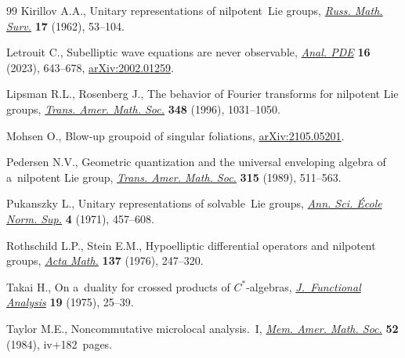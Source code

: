 \begin{thebibliography}{99}
Kirillov A.A., Unitary representations of nilpotent~{L}ie groups,
 \href{https://doi.org/10.1070/RM1962v017n04ABEH004118}{\textit{Russ. Math.
 Surv.}} \textbf{17} (1962), 53--104.

Letrouit C., Subelliptic wave equations are never observable,
 \href{https://doi.org/10.2140/apde.2023.16.643}{\textit{Anal. PDE}}
 \textbf{16} (2023), 643--678,
 \href{https://arxiv.org/abs/2002.01259}{arXiv:2002.01259}.

Lipsman R.L., Rosenberg J., The behavior of {F}ourier transforms for nilpotent
 {L}ie groups,
 \href{https://doi.org/10.1090/S0002-9947-96-01583-8}{\textit{Trans. Amer.
 Math. Soc.}} \textbf{348} (1996), 1031--1050.

Mohsen O., Blow-up groupoid of singular foliations,
 \href{https://arxiv.org/abs/2105.05201}{arXiv:2105.05201}.

Pedersen N.V., Geometric quantization and the universal enveloping algebra of a~nilpotent {L}ie group, \href{https://doi.org/10.2307/2001294}{\textit{Trans.
 Amer. Math. Soc.}} \textbf{315} (1989), 511--563.

Pukanszky L., Unitary representations of solvable~{L}ie groups,
 \href{https://doi.org/10.24033/asens.1218}{\textit{Ann. Sci. \'Ecole Norm.
 Sup.}} \textbf{4} (1971), 457--608.

Rothschild L.P., Stein E.M., Hypoelliptic differential operators and nilpotent
 groups, \href{https://doi.org/10.1007/BF02392419}{\textit{Acta Math.}}
 \textbf{137} (1976), 247--320.

Takai H., On a~duality for crossed products of {$C^{\ast} $}-algebras,
 \href{https://doi.org/10.1016/0022-1236(75)90004-x}{\textit{J.~Functional
 Analysis}} \textbf{19} (1975), 25--39.

Taylor M.E., Noncommutative microlocal analysis.~{I},
 \href{https://doi.org/10.1090/memo/0313}{\textit{Mem. Amer. Math. Soc.}}
 \textbf{52} (1984), iv+182~pages.

\end{thebibliography}


